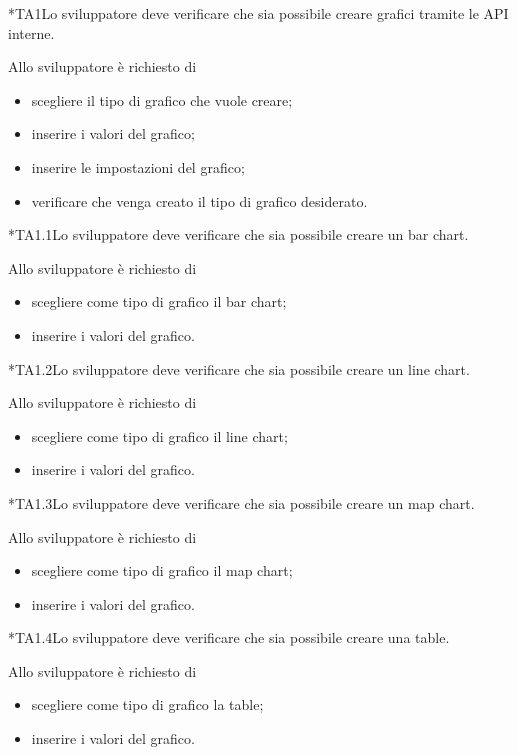 	*{TA1}Lo sviluppatore deve verificare che sia possibile creare grafici tramite le API interne.
	 
		Allo sviluppatore è richiesto di
		\begin{itemize}
			\item scegliere il tipo di grafico che vuole creare;
			\item inserire i valori del grafico;
			\item inserire le impostazioni del grafico;
			\item verificare che venga creato il tipo di grafico desiderato.
		\end{itemize}

	*{TA1.1}Lo sviluppatore deve verificare che sia possibile creare un bar chart.

		Allo sviluppatore è richiesto di
		\begin{itemize}
			\item scegliere come tipo di grafico il bar chart;
			\item inserire i valori del grafico.
		\end{itemize}

	*{TA1.2}Lo sviluppatore deve verificare che sia possibile creare un line chart.

		Allo sviluppatore è richiesto di
		\begin{itemize}
			\item scegliere come tipo di grafico il line chart;
			\item inserire i valori del grafico.
		\end{itemize}

	*{TA1.3}Lo sviluppatore deve verificare che sia possibile creare un map chart.

		Allo sviluppatore è richiesto di
		\begin{itemize}
			\item scegliere come tipo di grafico il map chart;
			\item inserire i valori del grafico.
		\end{itemize}

	*{TA1.4}Lo sviluppatore deve verificare che sia possibile creare una table.

		Allo sviluppatore è richiesto di
		\begin{itemize}
			\item scegliere come tipo di grafico la table;
			\item inserire i valori del grafico.
		\end{itemize}

